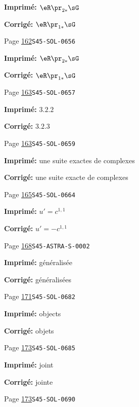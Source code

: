 \begin{description}
\par\noindent\textbf{Imprimé:} \(\eR \pr_{2\ast}\sG\)
\par\noindent\textbf{Corrigé:} \(\eR \pr_{1\ast}\sG\)
\smallskip
\item[\hypertarget{apparatus:FR-0132}{132}] Page \hyperlink{printpage:fr:162}{162}\quad\texttt{S45-SOL-0656}
\par\noindent\textbf{Imprimé:} \(\eR \pr_{2\ast}\sG\)
\par\noindent\textbf{Corrigé:} \(\eR \pr_{1\ast}\sG\)
\smallskip
\item[\hypertarget{apparatus:FR-0133}{133}] Page \hyperlink{printpage:fr:163}{163}\quad\texttt{S45-SOL-0657}
\par\noindent\textbf{Imprimé:} \(3.2.2\)
\par\noindent\textbf{Corrigé:} \(3.2.3\)
\smallskip
\item[\hypertarget{apparatus:FR-0134}{134}] Page \hyperlink{printpage:fr:163}{163}\quad\texttt{S45-SOL-0659}
\par\noindent\textbf{Imprimé:} une suite exactes de complexes
\par\noindent\textbf{Corrigé:} une suite exacte de complexes
\smallskip
\item[\hypertarget{apparatus:FR-0135}{135}] Page \hyperlink{printpage:fr:165}{165}\quad\texttt{S45-SOL-0664}
\par\noindent\textbf{Imprimé:} \(u'=c^{1,1}\)
\par\noindent\textbf{Corrigé:} \(u'=-c^{1,1}\)
\smallskip
\item[\hypertarget{apparatus:FR-0136}{136}] Page \hyperlink{printpage:fr:168}{168}\quad\texttt{S45-ASTRA-S-0002}
\par\noindent\textbf{Imprimé:} généralisée
\par\noindent\textbf{Corrigé:} généralisées
\smallskip
\item[\hypertarget{apparatus:FR-0137}{137}] Page \hyperlink{printpage:fr:171}{171}\quad\texttt{S45-SOL-0682}
\par\noindent\textbf{Imprimé:} objects
\par\noindent\textbf{Corrigé:} objets
\smallskip
\item[\hypertarget{apparatus:FR-0138}{138}] Page \hyperlink{printpage:fr:173}{173}\quad\texttt{S45-SOL-0685}
\par\noindent\textbf{Imprimé:} joint
\par\noindent\textbf{Corrigé:} jointe
\smallskip
\item[\hypertarget{apparatus:FR-0139}{139}] Page \hyperlink{printpage:fr:173}{173}\quad\texttt{S45-SOL-0690}

\end{description}
